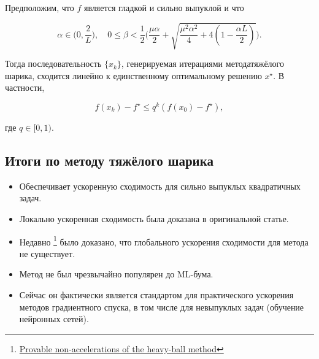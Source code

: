 \documentclass[
  russian,
  letterpaper,
  DIV=11,
  numbers=noendperiod]{scrartcl}
\providecommand{\tightlist}{%
  \setlength{\itemsep}{0pt}\setlength{\parskip}{0pt}}
\begin{document}
\begin{tcolorbox}[enhanced jigsaw, titlerule=0mm, opacityback=0, toptitle=1mm, colback=white, bottomtitle=1mm, toprule=.15mm, opacitybacktitle=0.6, title=\textcolor{quarto-callout-color}{\faInfo}\hspace{0.5em}{Theorem}, rightrule=.15mm, left=2mm, breakable, coltitle=black, arc=.35mm, leftrule=.75mm, colbacktitle=quarto-callout-color!10!white, bottomrule=.15mm, colframe=quarto-callout-color-frame]

Предположим, что \(f\) является гладкой и сильно выпуклой и что

\[
\alpha\in\biggl(0,\dfrac{2}{L}\biggr),\quad 0\leq  \beta<\dfrac{1}{2}\biggl( \dfrac{\mu \alpha}{2}+\sqrt{\dfrac{\mu^2\alpha^2}{4}+4(1-\frac{\alpha L}{2})} \biggr) .
\]

Тогда последовательность \(\{x_k\}\), генерируемая итерациями
методатяжёлого шарика, сходится линейно к единственному оптимальному
решению \(x^\star\). В частности,

\[
f(x_{k})-f^\star \leq q^k (f(x_0)-f^\star),
\]

где \(q\in[0,1)\).

\end{tcolorbox}

\subsection{Итоги по методу тяжёлого
шарика}\label{ux438ux442ux43eux433ux438-ux43fux43e-ux43cux435ux442ux43eux434ux443-ux442ux44fux436ux451ux43bux43eux433ux43e-ux448ux430ux440ux438ux43aux430}

\begin{itemize}
\tightlist
\item
  Обеспечивает ускоренную сходимость для сильно выпуклых квадратичных
  задач.
\item
  Локально ускоренная сходимость была доказана в оригинальной статье.
\item
  Недавно \footnote{\href{https://arxiv.org/pdf/2307.11291}{Provable
    non-accelerations of the heavy-ball method}} было доказано, что
  глобального ускорения сходимости для метода не существует.
\item
  Метод не был чрезвычайно популярен до ML-бума.
\item
  Сейчас он фактически является стандартом для практического ускорения
  методов градиентного спуска, в том числе для невыпуклых задач
  (обучение нейронных сетей).
\end{itemize}
\end{document}
